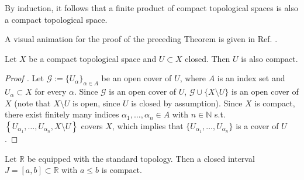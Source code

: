\begin{corollary}
	By induction, it follows that a finite product of compact topological spaces is also a compact topological space.
\end{corollary}

\begin{remark}
	A visual animation for the proof of the preceding Theorem is given in Ref. \cite{5082194}.
\end{remark}

\begin{theorem}
	Let $X$ be a compact topological space and $U\subset X$ closed. Then $U$ is also compact.
\end{theorem}

\begin{proof}[Proof \cite{877547}] Let $\mathscr G := \{U_{\alpha}\}_{\alpha\in A}$ be an open cover of $U$, where $A$ is an index set and $U_{\alpha}\subset X$ for every $\alpha$. Since $\mathscr G$ is an open cover of $U$, $\mathscr G \cup \{X\setminus U\}$ is an open cover of $X$ (note that $X\setminus U$ is open, since $U$ is closed by assumption). Since $X$ is compact, there exist finitely many indices $\alpha_{1}, \dots, \alpha_{n}\in A$ with $n\in \mathbb N$ s.t. $\left\{U_{\alpha_1}, \dots, U_{\alpha_n}, X\setminus U\right\}$ covers $X$, which implies that $\{U_{\alpha_1}, \dots, U_{\alpha_n}\}$ is a cover of $U$.
\end{proof}

\begin{theorem}\label{thrm:heine-borel}
	Let $\mathbb R$ be equipped with the standard topology. Then a closed interval $J = [a, b]\subset\mathbb R$ with $a\leq b$ is compact.
\end{theorem}

